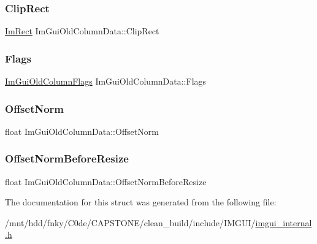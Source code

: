 \subsubsection{\texorpdfstring{Clip\+Rect}{ClipRect}}
{\footnotesize\ttfamily \hyperlink{structImRect}{Im\+Rect} Im\+Gui\+Old\+Column\+Data\+::\+Clip\+Rect}

\mbox{\label{structImGuiOldColumnData_ac31f2d6cf8d454163d2d5c46b7cb16ad}} 
\subsubsection{\texorpdfstring{Flags}{Flags}}
{\footnotesize\ttfamily \hyperlink{imgui__internal_8h_a930931ec4c54582a278a461676df4dda}{Im\+Gui\+Old\+Column\+Flags} Im\+Gui\+Old\+Column\+Data\+::\+Flags}

\mbox{\label{structImGuiOldColumnData_a87f711016d4006d7fb9fa21815fe6f8f}} 
\subsubsection{\texorpdfstring{Offset\+Norm}{OffsetNorm}}
{\footnotesize\ttfamily float Im\+Gui\+Old\+Column\+Data\+::\+Offset\+Norm}

\mbox{\label{structImGuiOldColumnData_aacf1574d1907c9afaadd5a702d6803ef}} 
\subsubsection{\texorpdfstring{Offset\+Norm\+Before\+Resize}{OffsetNormBeforeResize}}
{\footnotesize\ttfamily float Im\+Gui\+Old\+Column\+Data\+::\+Offset\+Norm\+Before\+Resize}



The documentation for this struct was generated from the following file\+:\begin{DoxyCompactItemize}
\item 
/mnt/hdd/fnky/\+C0de/\+C\+A\+P\+S\+T\+O\+N\+E/clean\+\_\+build/include/\+I\+M\+G\+U\+I/\hyperlink{imgui__internal_8h}{imgui\+\_\+internal.\+h}\end{DoxyCompactItemize}
